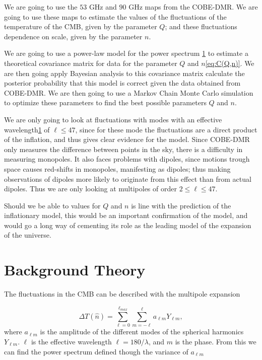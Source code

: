 \documentclass{emulateapj}
\begin{document}
We are going to use the $53$ GHz and $90$ GHz maps from the COBE-DMR. We are going to use these maps to estimate the values of the fluctuations of the temperature of the CMB, given by the parameter $Q$; and these fluctuations dependence on scale, given by the parameter $n$.

We are going to use a power-law model for the power spectrum \ref{sec:theory} to estimate a theoretical covariance matrix for data for the parameter $Q$ and $n$\eqref{eq:C(Q,n)}. We are then going apply Bayesian analysis to this covariance matrix calculate the posterior probability that this model is correct given the data obtained from COBE-DMR. We are then going to use a Markov Chain Monte Carlo simulation to optimize these parameters to find the best possible parameters $Q$ and $n$. 

We are only going to look at fluctuations with modes with an effective wavelength\ref{sec:theory} of $\ell \leq 47$, since for these mode the fluctuations are a direct product of the inflation, and thus gives clear evidence for the model. Since COBE-DMR only measures the difference between points in the sky, there is a difficulty in measuring monopoles. It also faces problems with dipoles, since motions trough space causes red-shifts in monopoles, manifesting as dipoles; thus making observations of dipoles more likely to originate from this effect than from actual dipoles. Thus we are only looking at multipoles of order $2 \leq \ell \leq 47$.

Should we be able to values for $Q$ and $n$ is line with the prediction of the inflationary model, this would be an important confirmation of the model, and would go a long way of cementing its role as the leading model of the expansion of the universe.


\section{Background Theory}
\label{sec:theory}

The fluctuations in the CMB can be described with the multipole expansion

\begin{equation}
\Delta T(\hat{n}) = \sum_{\ell = 0}^{\ell_{max}}\sum_{m = -\ell}^\ell a_{\ell m}Y_{\ell m},
\end{equation}
where $a_{\ell m}$ is the amplitude of the different modes of the spherical harmonics $Y_{\ell m}$. $\ell$ is the effective wavelength $\ell = 180/\lambda$, and $m$ is the phase. From this we can find the power spectrum defined though the variance of $a_{\ell m}$
\end{document}
